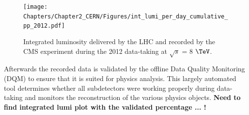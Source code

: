 \begin{figure}[h!t]
 \centering
 \texttt{[image: Chapters/Chapter2\_CERN/Figures/int\_lumi\_per\_day\_cumulative\_pp\_2012.pdf]}
 \caption{Integrated luminosity delivered by the LHC and recorded by the CMS experiment during the 2012 data-taking at $\sqrt{s}$ = 8 $\TeV$.} \label{fig::LumiEff}
\end{figure}

Afterwards the recorded data is validated by the offline Data Quality Monitoring (DQM) to ensure that it is suited for physics analysis. This largely automated tool determines whether all subdetectors were working properly during data-taking and monitors the reconstruction of the various physics objects. \textbf{Need to find integrated lumi plot with the validated percentage ... !}

